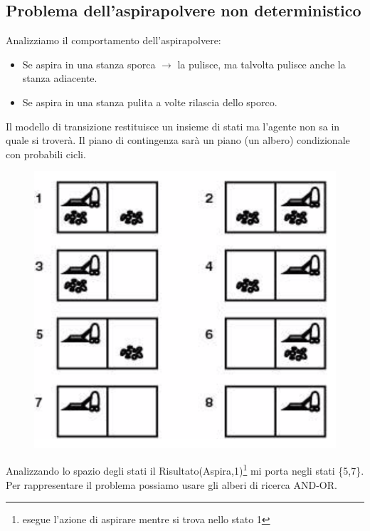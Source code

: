 \documentclass{article}
\begin{document}
\subsection{Problema dell'aspirapolvere non deterministico}
Analizziamo il comportamento dell'aspirapolvere:
\begin{itemize}
    \item Se aspira in una stanza sporca $\rightarrow$ la pulisce, ma talvolta pulisce anche la stanza adiacente.
    \item Se aspira in una stanza pulita a volte rilascia dello sporco.
\end{itemize}
Il modello di transizione restituisce un insieme di stati ma l'agente non sa in quale si troverà. Il piano di contingenza sarà un piano (un albero) condizionale con probabili cicli.
\begin{figure}[H]
    \centering
    \includegraphics[scale=0.4]{Images/statiaspirapolvere.png}
\end{figure}
Analizzando lo spazio degli stati il Risultato(Aspira,1)\footnote{esegue l'azione di aspirare mentre si trova nello stato 1} mi porta negli stati \{5,7\}. Per rappresentare il problema possiamo usare gli alberi di ricerca AND-OR.
\end{document}
